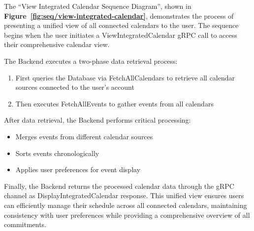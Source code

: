 The ``View Integrated Calendar Sequence Diagram'', shown in \textbf{Figure~\ref{fig:seq/view-integrated-calendar}}, demonstrates the process of presenting a unified view of all connected calendars to the user. The sequence begins when the user initiates a ViewIntegratedCalendar gRPC call to access their comprehensive calendar view.

The Backend executes a two-phase data retrieval process:
\begin{enumerate}
  \item First queries the Database via FetchAllCalendars to retrieve all calendar sources connected to the user's account
  \item Then executes FetchAllEvents to gather events from all calendars
\end{enumerate}

After data retrieval, the Backend performs critical processing:
\begin{itemize}
  \item Merges events from different calendar sources
  \item Sorts events chronologically
  \item Applies user preferences for event display
\end{itemize}

Finally, the Backend returns the processed calendar data through the gRPC channel as DisplayIntegratedCalendar response. This unified view ensures users can efficiently manage their schedule across all connected calendars, maintaining consistency with user preferences while providing a comprehensive overview of all commitments.